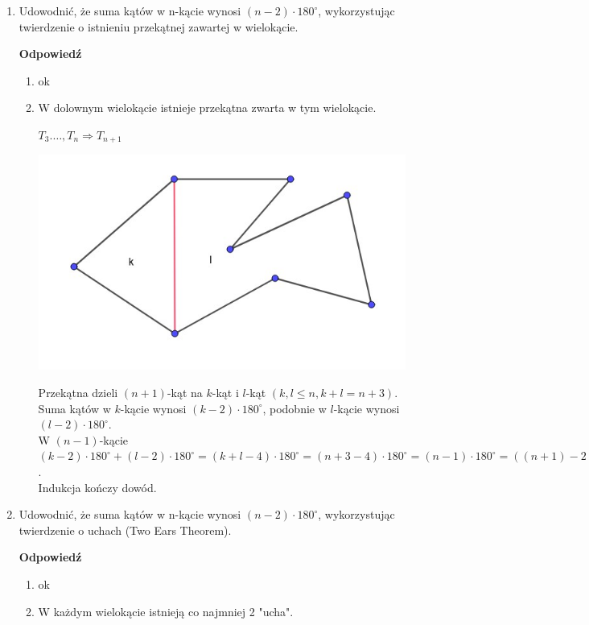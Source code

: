 \documentclass[12pt,a4paper]{article}
\newcounter{twierdzenie}
\theoremstyle{break}
\newcommand{\Odp}[1]{
		\begin{mdframed}[style=zadanie]
			\textbf{Odpowiedź}\\
			#1
		\end{mdframed}
	}
\begin{document}
\begin{enumerate}[1.]
{		Dowolny wielokąt wypukły o $n$ wierzchołkach można podzielić na $n-2$ trójkątów (w których kąty na siebie nie zachodzą), co daje nam w sumie $(n-2)\cdot 180^\circ$.
	}
	\newpage
	\item Udowodnić, że suma kątów w n-kącie wynosi $(n - 2) \cdot 180^\circ$, wykorzystując twierdzenie o istnieniu przekątnej zawartej w wielokącie.
	\Odp{
		\begin{enumerate}[I]
			\item ok
			\item W dolownym wielokącie istnieje przekątna zwarta w tym wielokącie.
			
			$T_3.\dots,T_n\Rightarrow T_{n+1}$
			
			\includegraphics[width=\linewidth]{1ind180.jpeg}
			
			Przekątna dzieli $(n+1)$-kąt na $k$-kąt i $l$-kąt $(k,l\leq n, k+l=n+3)$.\\
			
			Suma kątów w $k$-kącie wynosi $(k-2)\cdot180^\circ$, podobnie w $l$-kącie wynosi $(l-2)\cdot180^\circ$.\\
			
			W $(n-1)$-kącie $(k-2)\cdot180^\circ + (l-2)\cdot180^\circ = (k+l-4)\cdot180^\circ=(n+3-4)\cdot180^\circ = (n-1)\cdot180^\circ =((n+1)-2)\cdot180^\circ$.\\
			
			Indukcja kończy dowód. 
		\end{enumerate}
	}
	\newpage
	\item Udowodnić, że suma kątów w n-kącie wynosi $(n - 2) \cdot 180^\circ$, wykorzystując twierdzenie o uchach (Two Ears Theorem).
	\Odp{
		\begin{enumerate}[I]
			\item ok
			\item W każdym wielokącie istnieją co najmniej 2 "ucha".
			

\end{enumerate}}
\end{enumerate}
\end{document}
